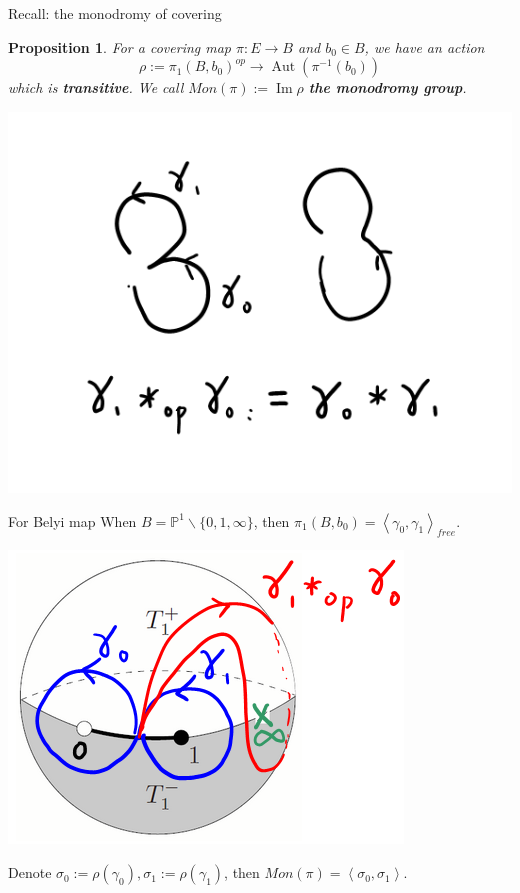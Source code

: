 \documentclass[pdf]{beamer}
\numberwithin{equation}{section}
\theoremstyle{plain}
\newtheorem{proposition}[theorem]{Proposition}
\theoremstyle{plain}
\theoremstyle{remark}
\DeclareMathOperator{\Aut}{\operatorname{Aut}}
\DeclareMathOperator{\Img}{\operatorname{Im}}
\begin{document}
\begin{frame}{Recall: the monodromy of covering}
\begin{proposition}
	For a covering map $\pi \colon E \longrightarrow B$ and $b_0 \in B$, we have an action
	$$\rho:= \pi_1(B,b_0)^{op} \longrightarrow \Aut (\pi^{-1}(b_0))$$
	which is \textbf{transitive}. We call $Mon(\pi):= \Img \rho$ \textbf{the monodromy group}.
\end{proposition}
\begin{center}
	\includegraphics[height=.42\textheight]{figures/op.png}
\end{center}
\end{frame}
\begin{frame}{For Belyi map}
When $B=\mathbb{P}^1 \smallsetminus \{0,1,\infty\}$, then
$\pi_1(B,b_0)=\left\langle\gamma_0,\gamma_1\right\rangle_{free}$.

\begin{center}
	\includegraphics[width=.5\textwidth]{figures/Gamma(2).png}
\end{center}

Denote $\sigma_0:=\rho (\gamma_0), \sigma_1:=\rho (\gamma_1)$, then $Mon(\pi)=\left\langle\sigma_0,\sigma_1\right\rangle$.
\end{frame}
\end{document}
